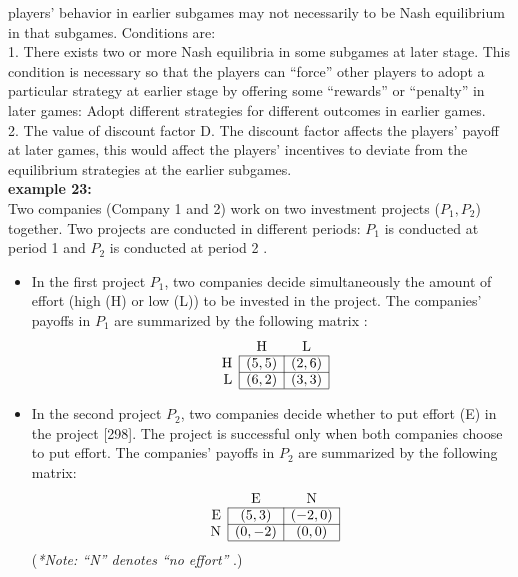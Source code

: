 \documentclass[twoside]{article}
\theoremstyle{definitionstyle}
\renewcommand{\cite}[1]{[#1]}
\begin{document}
\newline
players' behavior in earlier subgames may not necessarily to be Nash equilibrium in that subgames. Conditions are:\\ 
1. There exists two or more Nash equilibria in some subgames at later stage. This condition is necessary so that the players can “force” other players to adopt a particular strategy at earlier stage by offering some “rewards” or “penalty” in later games: Adopt different strategies for different outcomes in earlier games. \\
2. The value of discount factor D. The discount factor affects the players' payoff at later games, this would affect the players' incentives to deviate from the equilibrium strategies at the earlier subgames. \\
\newline
\textbf{example 23:}\\
Two companies (Company 1 and 2) work on two investment projects ($P_1, P_2$) together. Two projects are conducted in different periods: $P_1$ is conducted at period 1 and $P_2$ is conducted at period 2 .

\begin{itemize}
    \item In the first project $P_1$, two companies decide simultaneously the amount of effort (high (H) or low (L)) to be invested in the project. The companies' payoffs in $P_1$ are summarized by the following matrix :
    \[
    \begin{array}{r|c|c|}
    \multicolumn{1}{r}{} & \multicolumn{1}{c}{\text{H}} & \multicolumn{1}{c}{\text{L}} \\ \cline{2-3}
    \text{H} & (5, 5) & (2, 6) \\ \cline{2-3}
    \text{L} & (6, 2) & (3, 3) \\ \cline{2-3}
    \end{array}
    \]
    
    \item In the second project $P_2$, two companies decide whether to put effort (E) in the project \cite{298}. The project is successful only when both companies choose to put effort. The companies' payoffs in $P_2$ are summarized by the following matrix:
    \[
    \begin{array}{r|c|c|}
    \multicolumn{1}{r}{} & \multicolumn{1}{c}{\text{E}} & \multicolumn{1}{c}{\text{N}} \\ \cline{2-3}
    \text{E} & (5, 3) & (-2, 0) \\ \cline{2-3}
    \text{N} & (0, -2) & (0, 0) \\ \cline{2-3}
    \end{array}
    \]
    (\textit{*Note: ``N'' denotes ``no effort''} .)
\end{itemize}
\end{document}
